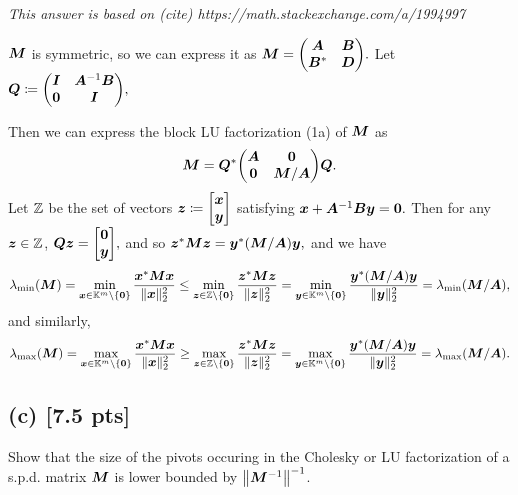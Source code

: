 \documentclass[twoside,10pt]{article}
\newcommand{\Z}{\mathbbm{Z}}
\begin{document}
\textit{This answer is based on (cite) https://math.stackexchange.com/a/1994997}

$\bm{M}$ is symmetric, so we can express it as $\mtx{M} = \begin{pmatrix}
  \mtx{A} & \mtx{B}\\
  \mtx{B}^{*} & \mtx{D}
\end{pmatrix}.$ Let $\mtx{Q} \coloneqq \begin{pmatrix}
  \mtx{I} & \mtx{A}^{-1} \mtx{B} \\
  \mtx{0} & \mtx{I}
\end{pmatrix},$

Then we can express the block LU factorization (1a) of $\bm{M}$ as
\begin{equation*}
  \mtx{M} = 
  \mtx{Q}^{*} 
  \begin{pmatrix}
    \mtx{A} & \mtx{0} \\
    \mtx{0} & \mtx{M} / \mtx{A}
  \end{pmatrix}
  \mtx{Q}. 
\end{equation*}
Let $\Z$ be the set of vectors $\bm{z} \coloneqq \begin{bmatrix}\bm{x}\\\bm{y}\end{bmatrix}$ satisfying $\bm{x} + \bm{A}^{-1}\bm{B}\bm{y} = \bm{0}.$ 
Then for any $\vct{z} \in \Z$, $\mtx{Q}\vct{z} = \begin{bmatrix}\vct{0}\\\vct{y}\end{bmatrix},$ and so $\vct{z}^{*} \mtx{M}\vct{z} = \vct{y}^{*}\left(\mtx{M} / \mtx{A}\right)\vct{y},$ and we have
$$\lambda_{\min}\left(\mtx{M}\right) =\min \limits_{\vct{x} \in \K^m \setminus \{\vct{0}\}} \frac{\vct{x}^{*}\mtx{M}\vct{x}}{\|\vct{x}\|_2^2} \leq \min \limits_{\vct{z} \in \Z \setminus \{\vct{0}\}} \frac{\vct{z}^{*} \mtx{M}\vct{z}}{\|\vct{z}\|_2^2} = \min \limits_{\vct{y} \in \K^m \setminus \{\vct{0}\}} \frac{\vct{y}^{*} \left(\mtx{M}/\mtx{A}\right)\vct{y}}{\|\vct{y}\|_2^2} = \lambda_{\min}\left(\mtx{M} / \mtx{A}\right),$$
and similarly,
$$\lambda_{\max}\left(\mtx{M}\right) =\max \limits_{\vct{x} \in \K^m \setminus \{\vct{0}\}} \frac{\vct{x}^{*}\mtx{M}\vct{x}}{\|\vct{x}\|_2^2} \geq \max \limits_{\vct{z} \in \Z \setminus \{\vct{0}\}} \frac{\vct{z}^{*} \mtx{M}\vct{z}}{\|\vct{z}\|_2^2} = \max \limits_{\vct{y} \in \K^m \setminus \{\vct{0}\}} \frac{\vct{y}^{*} \left(\mtx{M}/\mtx{A}\right)\vct{y}}{\|\vct{y}\|_2^2} = \lambda_{\max}\left(\mtx{M} / \mtx{A}\right).$$
 
\subsection*{(c) [7.5 pts]} 
Show that the size of the pivots occuring in the Cholesky or LU factorization of a s.p.d. matrix $\bm{M}$ is lower bounded by $\left\|\mtx{M}^{-1}\right\|^{-1}$.
\end{document}

